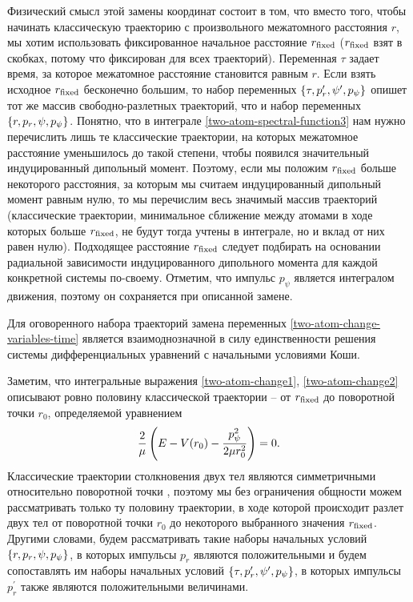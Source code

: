 Физический смысл этой замены координат состоит в том, что вместо того, чтобы начинать классическую траекторию с произвольного межатомного расстояния $r$, мы хотим использовать фиксированное начальное расстояние $r_\text{fixed}$ ($r_\text{fixed}$ взят в скобках, потому что фиксирован для всех траекторий). Переменная $\tau$ задает время, за которое межатомное расстояние становится равным $r$. Если взять исходное $r_\text{fixed}$ бесконечно большим, то набор переменных $\left\{ \tau, p_r^\prime, \psi^\prime, p_\psi \right\}$ опишет тот же массив свободно-разлетных траекторий, что и набор переменных $\left\{ r, p_r, \psi, p_\psi \right\}$. Понятно, что в интеграле \eqref{two-atom-spectral-function3} нам нужно перечислить лишь те классические траектории, на которых межатомное расстояние уменьшилось до такой степени, чтобы появился значительный индуцированный дипольный момент. Поэтому, если мы положим $r_\text{fixed}$ больше некоторого расстояния, за которым мы считаем индуцированный дипольный момент равным нулю, то мы перечислим весь значимый массив траекторий (классические траектории, минимальное сближение между атомами в ходе которых больше $r_\text{fixed}$, не будут тогда учтены в интеграле, но и вклад от них равен нулю). Подходящее расстояние $r_\text{fixed}$ следует подбирать на основании радиальной зависимости индуцированного дипольного момента для каждой конкретной системы по-своему. Отметим, что импульс $p_\psi$ является интегралом движения, поэтому он сохраняется при описанной замене. \par
Для оговоренного набора траекторий замена переменных \eqref{two-atom-change-variables-time} является взаимоднозначной в силу единственности решения системы дифференциальных уравнений с начальными условиями Коши. \par
Заметим, что интегральные выражения \eqref{two-atom-change1}, \eqref{two-atom-change2} описывают ровно половину классической траектории -- от $r_\text{fixed}$ до поворотной точки $r_0$, определяемой уравнением
\begin{gather}
    \frac{2}{\mu} \left( E - V(r_0) - \frac{p_\psi^2}{2 \mu r_0^2} \right) = 0.
\end{gather}
Классические траектории столкновения двух тел являются симметричными относительно поворотной точки \cite{goldstein}, поэтому мы без ограничения общности можем рассматривать только ту половину траектории, в ходе которой происходит разлет двух тел от поворотной точки $r_0$ до некоторого выбранного значения $r_\text{fixed}$. Другими словами, будем рассматривать такие наборы начальных условий $\left\{ r, p_r, \psi, p_\psi \right\}$,  в которых импульсы $p_r$ являются положительными и будем сопоставлять им наборы начальных условий $\left\{ \tau, p_r^\prime, \psi^\prime, p_\psi \right\}$, в которых импульсы $p_r^\prime$ также являются положительными величинами. \par
